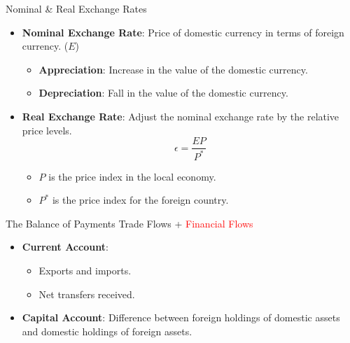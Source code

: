 \documentclass[shownotes,11pt, aspectratio=169]{beamer}
\begin{document}
\begin{frame}{Nominal \& Real Exchange Rates}
\begin{itemize}
\item \textbf{Nominal Exchange Rate}: Price of domestic currency in terms of foreign currency. ($E$)
       \begin{itemize}
       \item \textbf{Appreciation}: Increase in the value of the domestic currency.
       \item \textbf{Depreciation}: Fall in the value of the domestic currency.
       \end{itemize}
\vspace{3mm}
\item \textbf{Real Exchange Rate}: Adjust the nominal exchange rate by the relative price levels.
           \[ \epsilon = \frac{EP}{P^{\ast}} \]
        \begin{itemize}
        \item $P$ is the price index in the local economy.
        \item $P^{\ast}$ is the price index for the foreign country.
        \end{itemize}
\end{itemize}
\end{frame}

\begin{frame}{The Balance of Payments}
\textcolor{ao(english)}{Trade Flows} + \textcolor{red}{Financial Flows}

\vspace{6mm}
\pause

\begin{itemize}
\item \textbf{Current Account}:
      \begin{itemize}
      \item Exports and imports.
      \item Net transfers received.
      \end{itemize}
\item \textbf{Capital Account}: Difference between foreign holdings of domestic assets and domestic holdings of foreign assets.
\end{itemize}
\end{frame}
\end{document}
